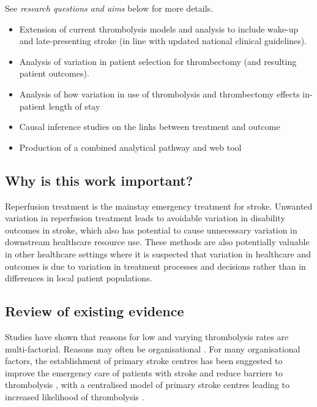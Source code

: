 See \textit{research questions and aims} below for more details. 

\begin{itemize}

    \item Extension of current thrombolysis models and analysis to include wake-up and late-presenting stroke (in line with updated national clinical guidelines).
    
    \item Analysis of variation in patient selection for thrombectomy (and resulting patient outcomes).

    \item Analysis of how variation in use of thrombolysis and thrombectomy effects in-patient length of stay

    \item Causal inference studies on the links between treatment and outcome

    \item Production of a combined analytical pathway and web tool
    
\end{itemize}

\subsection{Why is this work important?}

Reperfusion treatment is the mainstay emergency treatment for stroke. Unwanted variation in reperfusion treatment leads to avoidable variation in disability outcomes in stroke, which also has potential to cause unnecessary variation in downstream healthcare resource use. These methods are also potentially valuable in other healthcare settings where it is suspected that variation in healthcare and outcomes is due to variation in treatment processes and decisions rather than in differences in local patient populations.

\subsection{Review of existing evidence}

Studies have shown that reasons for low and varying thrombolysis rates are multi-factorial. Reasons may often be organisational \cite{aguiar_de_sousa_access_2019, kamal_delays_2017, carter-jones_stroke_2011}. For many organisational factors, the establishment of primary stroke centres has been suggested to improve the emergency care of patients with stroke and reduce barriers to thrombolysis \cite{carter-jones_stroke_2011},  with a centralised model of primary stroke centres leading to increased likelihood of thrombolysis \cite{lahr_proportion_2012, morris_impact_2014, hunter_impact_2013}. 

